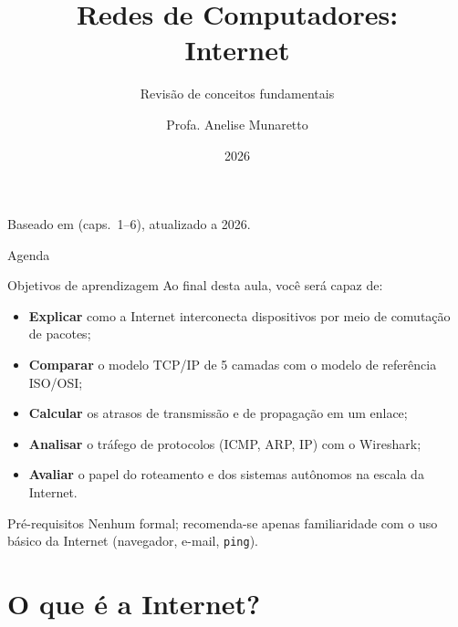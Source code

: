 \documentclass[aspectratio=169,11pt]{beamer}
\title[Redes: Internet]{Redes de Computadores:\\ Internet}
\subtitle{Revisão de conceitos fundamentais}
\author[Anelise Munaretto]{Profa. Anelise Munaretto}
\institute[Curso]{Redes sem Fio --- Ciência da Computação}
\date{2026}
\begin{document}
\begin{frame}[plain]
  \titlepage
  \begin{center}
    \scriptsize Baseado em \kurose{} (caps.~1--6), atualizado a 2026.
  \end{center}
\end{frame}

\begin{frame}{Agenda}
  \tableofcontents
\end{frame}

\begin{frame}{Objetivos de aprendizagem}
  Ao final desta aula, você será capaz de:
  \begin{itemize}
    \item \textbf{Explicar} como a Internet interconecta dispositivos por meio de comutação de pacotes;
    \item \textbf{Comparar} o modelo TCP/IP de 5 camadas com o modelo de referência ISO/OSI;
    \item \textbf{Calcular} os atrasos de transmissão e de propagação em um enlace;
    \item \textbf{Analisar} o tráfego de protocolos (ICMP, ARP, IP) com o Wireshark;
    \item \textbf{Avaliar} o papel do roteamento e dos sistemas autônomos na escala da Internet.
  \end{itemize}
  \begin{alertblock}{Pré-requisitos}
    Nenhum formal; recomenda-se apenas familiaridade com o uso básico da Internet (navegador, e-mail, \texttt{ping}).
  \end{alertblock}
\end{frame}

\section{O que é a Internet?}
\end{document}

